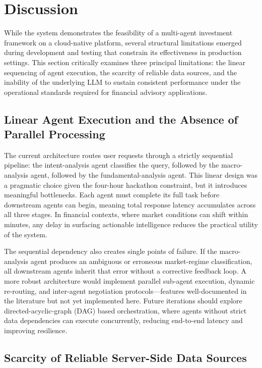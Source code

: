 \documentclass[11pt,a4paper]{article}
\begin{document}
\section{Discussion}
\label{sec:discussion}

While the system demonstrates the feasibility of a multi-agent
investment framework on a cloud-native platform, several structural
limitations emerged during development and testing that constrain its
effectiveness in production settings. This section critically examines
three principal limitations: the linear sequencing of agent execution,
the scarcity of reliable data sources, and the inability of the
underlying LLM to sustain consistent performance under the operational
standards required for financial advisory applications.

\subsection{Linear Agent Execution and the Absence of Parallel Processing}

The current architecture routes user requests through a strictly
sequential pipeline: the intent-analysis agent classifies the query,
followed by the macro-analysis agent, followed by the
fundamental-analysis agent. This linear design was a pragmatic choice
given the four-hour hackathon constraint, but it introduces meaningful
bottlenecks. Each agent must complete its full task before downstream
agents can begin, meaning total response latency accumulates across all
three stages. In financial contexts, where market conditions can shift
within minutes, any delay in surfacing actionable intelligence reduces
the practical utility of the system.

The sequential dependency also creates single points of failure. If the
macro-analysis agent produces an ambiguous or erroneous market-regime
classification, all downstream agents inherit that error without a
corrective feedback loop. A more robust architecture would implement
parallel sub-agent execution, dynamic re-routing, and inter-agent
negotiation protocols---features well-documented in the literature
\cite{hu2026xmemory,zhao2025alphaagents} but not yet implemented here.
Future iterations should explore directed-acyclic-graph (DAG) based
orchestration, where agents without strict data dependencies can execute
concurrently, reducing end-to-end latency and improving resilience.

\subsection{Scarcity of Reliable Server-Side Data Sources}
\end{document}
